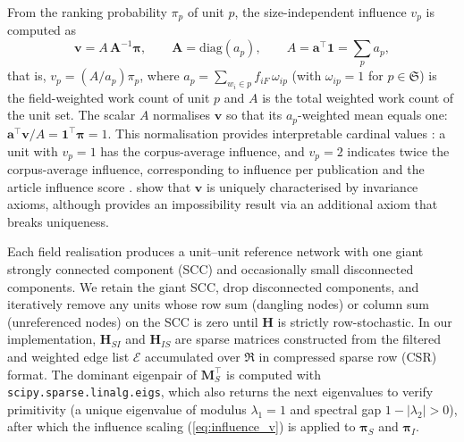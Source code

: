 From the ranking probability $\pi_p$ of unit $p$, the size-independent influence $v_p$ is computed as \citep{palacios-huertaMeasurementIntellectualInfluence2004}
\begin{equation}
    \mathbf{v} = A\, \mathbf{A}^{-1} \boldsymbol{\pi}, \qquad \mathbf{A} = \mathrm{diag}(a_p), \qquad A = \mathbf{a}^\top \mathbf{1} = \sum_p a_p,
    \label{eq:influence_v}
\end{equation}
that is, $v_p = (A / a_p) \pi_p$, where $a_p = \sum_{w_i \in p} f_{iF}\, \omega_{ip}$ (with $\omega_{ip} = 1$ for $p \in \mathfrak{S}$) is the field-weighted work count of unit $p$ and $A$ is the total weighted work count of the unit set. The scalar $A$ normalises $\mathbf{v}$ so that its $a_p$-weighted mean equals one: $\mathbf{a}^\top \mathbf{v} / A = \mathbf{1}^\top \boldsymbol{\pi} = 1$. This normalisation provides interpretable cardinal values \citep{stevensTheoryScalesMeasurement1946}: a unit with $v_p = 1$ has the corpus-average influence, and $v_p = 2$ indicates twice the corpus-average influence, corresponding to influence per publication \citep{pinskiCitationInfluenceJournal1976} and the article influence score \citep{bergstromEigenfactorMetrics2008}. \citet{palacios-huertaMeasurementIntellectualInfluence2004} show that $\mathbf{v}$ is uniquely characterised by invariance axioms, although \citet{serranoMeasurementIntellectualInfluence2004} provides an impossibility result via an additional axiom that breaks uniqueness.

Each field realisation produces a unit--unit reference network with one giant strongly connected component (SCC) and occasionally small disconnected components. We retain the giant SCC, drop disconnected components, and iteratively remove any units whose row sum (dangling nodes) or column sum (unreferenced nodes) on the SCC is zero until $\mathbf{H}$ is strictly row-stochastic. In our implementation, $\mathbf{H}_{SI}$ and $\mathbf{H}_{IS}$ are sparse matrices constructed from the filtered and weighted edge list $\mathcal{E}$ accumulated over $\mathfrak{R}$ in compressed sparse row (CSR) format. The dominant eigenpair of $\mathbf{M}_S^\top$ is computed with \texttt{scipy.sparse.linalg.eigs}, which also returns the next eigenvalues to verify primitivity (a unique eigenvalue of modulus $\lambda_1 = 1$ and spectral gap $1 - |\lambda_2| > 0$), after which the influence scaling (\ref{eq:influence_v}) is applied to $\boldsymbol{\pi}_S$ and $\boldsymbol{\pi}_I$.
